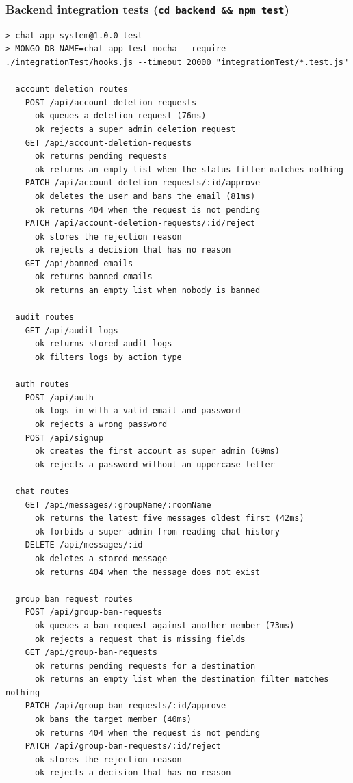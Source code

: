 \documentclass[10pt,a4paper]{article}
\newcommand{\ep}[1]{\texttt{\small #1}}
\begin{document}
\subsubsection*{Backend integration tests (\ep{cd backend \&\& npm test})}
\begin{Verbatim}[fontsize=\scriptsize,breaklines,frame=single]
> chat-app-system@1.0.0 test
> MONGO_DB_NAME=chat-app-test mocha --require ./integrationTest/hooks.js --timeout 20000 "integrationTest/*.test.js"

  account deletion routes
    POST /api/account-deletion-requests
      ok queues a deletion request (76ms)
      ok rejects a super admin deletion request
    GET /api/account-deletion-requests
      ok returns pending requests
      ok returns an empty list when the status filter matches nothing
    PATCH /api/account-deletion-requests/:id/approve
      ok deletes the user and bans the email (81ms)
      ok returns 404 when the request is not pending
    PATCH /api/account-deletion-requests/:id/reject
      ok stores the rejection reason
      ok rejects a decision that has no reason
    GET /api/banned-emails
      ok returns banned emails
      ok returns an empty list when nobody is banned

  audit routes
    GET /api/audit-logs
      ok returns stored audit logs
      ok filters logs by action type

  auth routes
    POST /api/auth
      ok logs in with a valid email and password
      ok rejects a wrong password
    POST /api/signup
      ok creates the first account as super admin (69ms)
      ok rejects a password without an uppercase letter

  chat routes
    GET /api/messages/:groupName/:roomName
      ok returns the latest five messages oldest first (42ms)
      ok forbids a super admin from reading chat history
    DELETE /api/messages/:id
      ok deletes a stored message
      ok returns 404 when the message does not exist

  group ban request routes
    POST /api/group-ban-requests
      ok queues a ban request against another member (73ms)
      ok rejects a request that is missing fields
    GET /api/group-ban-requests
      ok returns pending requests for a destination
      ok returns an empty list when the destination filter matches nothing
    PATCH /api/group-ban-requests/:id/approve
      ok bans the target member (40ms)
      ok returns 404 when the request is not pending
    PATCH /api/group-ban-requests/:id/reject
      ok stores the rejection reason
      ok rejects a decision that has no reason


\end{Verbatim}
\end{document}
